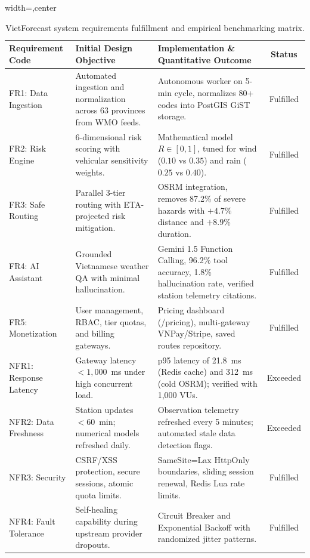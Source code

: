\begin{table}[htbp]
\centering
\caption[System goal fulfillment and benchmarking matrix]{VietForecast system requirements fulfillment and empirical benchmarking matrix.}
\label{tab:goal_fulfillment_en}
\begin{adjustbox}{width=\textwidth,center}
\begin{tabular}{p{3.2cm}p{4.8cm}p{6.5cm}c}
\toprule
\textbf{Requirement Code} & \textbf{Initial Design Objective} & \textbf{Implementation \& Quantitative Outcome} & \textbf{Status} \\
\midrule
FR1: Data Ingestion & Automated ingestion and normalization across 63 provinces from WMO feeds. & Autonomous worker on 5-min cycle, normalizes 80+ codes into PostGIS GiST storage. & Fulfilled \\
\addlinespace[0.4em]
FR2: Risk Engine & 6-dimensional risk scoring with vehicular sensitivity weights. & Mathematical model $R \in [0, 1]$, tuned for wind ($0.10$ vs $0.35$) and rain ($0.25$ vs $0.40$). & Fulfilled \\
\addlinespace[0.4em]
FR3: Safe Routing & Parallel 3-tier routing with ETA-projected risk mitigation. & OSRM integration, removes 87.2\% of severe hazards with $+4.7\%$ distance and $+8.9\%$ duration. & Fulfilled \\
\addlinespace[0.4em]
FR4: AI Assistant & Grounded Vietnamese weather QA with minimal hallucination. & Gemini 1.5 Function Calling, 96.2\% tool accuracy, 1.8\% hallucination rate, verified station telemetry citations. & Fulfilled \\
\addlinespace[0.4em]
FR5: Monetization & User management, RBAC, tier quotas, and billing gateways. & Pricing dashboard (/pricing), multi-gateway VNPay/Stripe, saved routes repository. & Fulfilled \\
\midrule
NFR1: Response Latency & Gateway latency $< 1,000$~ms under high concurrent load. & p95 latency of 21.8~ms (Redis cache) and 312~ms (cold OSRM); verified with 1,000 VUs. & Exceeded \\
\addlinespace[0.4em]
NFR2: Data Freshness & Station updates $< 60$~min; numerical models refreshed daily. & Observation telemetry refreshed every 5 minutes; automated stale data detection flags. & Exceeded \\
\addlinespace[0.4em]
NFR3: Security & CSRF/XSS protection, secure sessions, atomic quota limits. & SameSite=Lax HttpOnly boundaries, sliding session renewal, Redis Lua rate limits. & Fulfilled \\
\addlinespace[0.4em]
NFR4: Fault Tolerance & Self-healing capability during upstream provider dropouts. & Circuit Breaker and Exponential Backoff with randomized jitter patterns. & Fulfilled \\
\bottomrule
\end{tabular}
\end{adjustbox}
\end{table}

